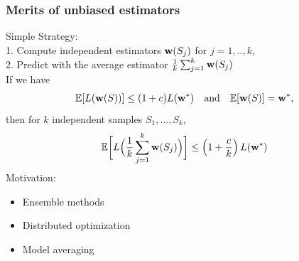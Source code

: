 \documentclass{beamer}
\begin{document}
\begin{frame}
  \frametitle{Merits of unbiased estimators}
Simple Strategy: \\
1. Compute independent estimators $\mathbf w(S_j)$ for $j=1,..,k$,\\
2. Predict with the average estimator $\frac{1}{k}\sum_{j=1}^k\mathbf w(S_j)$\\[4mm]
\pause
If we have 
\begin{align*}
\mathbb E[L(\mathbf w(S))]\leq (1+c)L(\mathbf w^*)
\quad\text{and}\quad\mathbb E[\mathbf w(S)]=\mathbf w^*,
\end{align*}
then for $k$ independent samples $S_1,\ldots,S_k$,
$$\mathbb E\bigg[L\Big(\frac{1}{k}\sum_{j=1}^k \mathbf w(S_j) \Big)\bigg]
  \leq \left(1 + \frac{c}{k}\right)L(\mathbf w^*)$$
\pause
Motivation:
\begin{itemize}
\item Ensemble methods
\item Distributed optimization
\item Model averaging
\end{itemize}
\end{frame}


\end{document}
